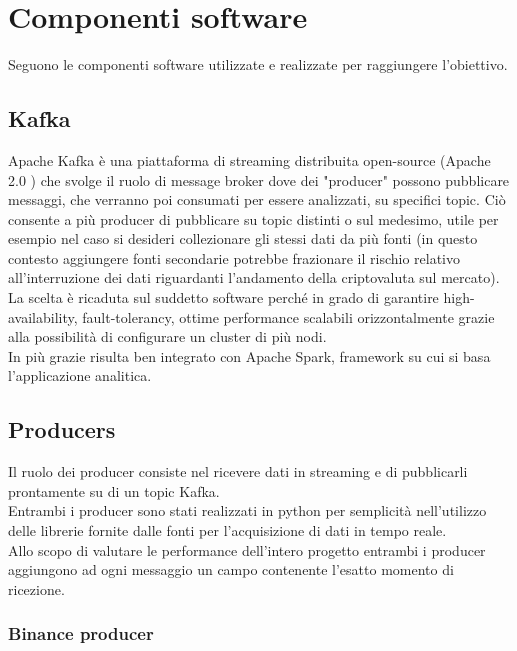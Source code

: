 \section{Componenti software}

Seguono le componenti software utilizzate e realizzate per raggiungere l'obiettivo.

\subsection{Kafka}

Apache Kafka è una piattaforma di streaming distribuita open-source
(Apache 2.0 \cite{apache2_license}) che svolge il ruolo di message broker
dove dei "producer" possono pubblicare messaggi, che verranno poi consumati per essere analizzati,
su specifici topic. Ciò consente a più producer di pubblicare su topic distinti o sul medesimo,
utile per esempio nel caso si desideri collezionare gli stessi dati da più fonti
(in questo contesto aggiungere fonti secondarie potrebbe frazionare il rischio relativo
all'interruzione dei dati riguardanti l'andamento della criptovaluta sul mercato).
\\
La scelta è ricaduta sul suddetto software perché in grado di garantire
high-availability, fault-tolerancy, ottime performance scalabili orizzontalmente grazie
alla possibilità di configurare un cluster di più nodi. \cite{kafka_doc}
\\
In più grazie risulta ben integrato con Apache Spark, framework su cui si basa l'applicazione
analitica.

\subsection{Producers}

Il ruolo dei producer consiste nel ricevere dati in streaming e di
pubblicarli prontamente su di un topic Kafka.
\\
Entrambi i producer sono stati realizzati in python per semplicità nell'utilizzo delle
librerie fornite dalle fonti per l'acquisizione di dati in tempo reale.
\\
Allo scopo di valutare le performance dell'intero progetto entrambi i producer aggiungono
ad ogni messaggio un campo contenente l'esatto momento di ricezione.

\subsubsection{Binance producer}

